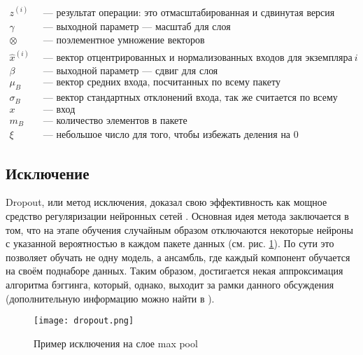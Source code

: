 \begin{align*}
	z^{(i)}      & \: \text{ --- результат операции: это отмасштабированная и сдвинутая версия входов}  \\
	\gamma       & \: \text{ --- выходной параметр --- масштаб для слоя}                                \\
	\otimes      & \: \text{ --- поэлементное умножение векторов}                                       \\
	\hat x^{(i)} & \: \text{ --- вектор отцентрированных и нормализованных входов для экземпляра} \: i  \\
	\beta        & \: \text{ --- выходной параметр --- сдвиг для слоя}                                  \\
	\mu_B        & \: \text{ --- вектор средних входа, посчитанных по всему пакету}                     \\
	\sigma_B     & \: \text{ --- вектор стандартных отклонений входа, так же считается по всему пакету} \\
	x            & \: \text{ --- вход}                                                                  \\
	m_B          & \: \text{ --- количество элементов в пакете}                                         \\
	\xi          & \: \text{ --- небольшое число для того, чтобы избежать деления на 0}
\end{align*}

\subsection{Исключение}

Dropout, или метод исключения, доказал свою эффективность как мощное средство
регуляризации нейронных сетей \cite{dropout-is-good}. Основная идея метода
заключается в том, что на этапе обучения случайным образом отключаются
некоторые нейроны с указанной вероятностью в каждом пакете данных (см. рис.
\ref{fig:dropout}). По сути это позволяет обучать не одну модель, а ансамбль,
где каждый компонент обучается на своём поднаборе данных. Таким образом,
достигается некая аппроксимация алгоритма бэггинга, который, однако, выходит за
рамки данного обсуждения (дополнительную информацию можно найти в
\cite{goodfellow}).

\begin{figure}[!htb]
	\centering
	\texttt{[image: dropout.png]}
	\caption{Пример исключения на слое max pool}
	\label{fig:dropout}
\end{figure}

